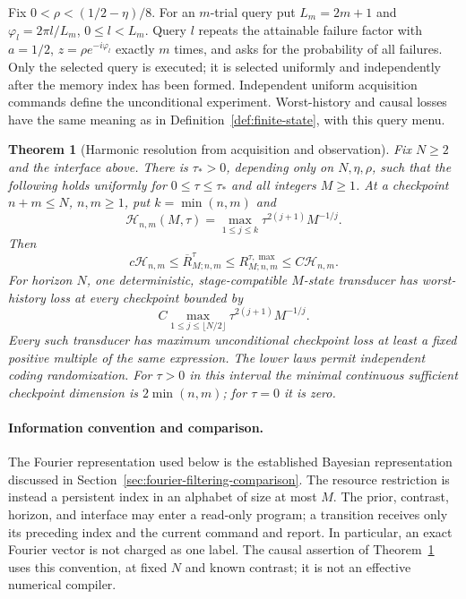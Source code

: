 \documentclass[11pt]{amsart}
\newtheorem{theorem}{Theorem}[section]
\theoremstyle{definition}\newtheorem{definition}[theorem]{Definition}
\theoremstyle{remark}\newtheorem{remark}[theorem]{Remark}
\begin{document}
Fix $0<\rho<(1/2-\eta)/8$. For an $m$-trial query put
$L_m=2m+1$ and $\varphi_l=2\pi l/L_m$, $0\le l<L_m$.
Query $l$ repeats the attainable failure factor with
$a=1/2$, $z=\rho e^{-i\varphi_l}$ exactly $m$ times, and asks for
the probability of all failures. Only the selected query is executed;
it is selected uniformly and independently after the memory index has
been formed. Independent uniform acquisition commands define the
unconditional experiment. Worst-history and causal losses have the same
meaning as in Definition~\ref{def:finite-state}, with this query menu.

\begin{theorem}[Harmonic resolution from acquisition and observation]
\label{thm:circle-resolution}
Fix $N\ge2$ and the interface above. There is $\tau_*>0$, depending
only on $N,\eta,\rho$, such that the following holds uniformly for
$0\le\tau\le\tau_*$ and all integers $M\ge1$. At a checkpoint
$n+m\le N$, $n,m\ge1$, put $k=\min(n,m)$ and
\begin{equation}\label{eq:circle-profile}
 \mathcal H_{n,m}(M,\tau)
 =\max_{1\le j\le k}\tau^{2(j+1)}M^{-1/j}.
\end{equation}
Then
\begin{equation}\label{eq:circle-checkpoint-law}
 c\mathcal H_{n,m}\le\overline R^{\tau}_{M;n,m}
 \le R^{\tau,\max}_{M;n,m}\le C\mathcal H_{n,m}.
\end{equation}
For horizon $N$, one deterministic, stage-compatible $M$-state transducer
has worst-history loss at every checkpoint bounded by
\begin{equation}\label{eq:circle-causal-profile}
 C\max_{1\le j\le\lfloor N/2\rfloor}
          \tau^{2(j+1)}M^{-1/j}.
\end{equation}
Every such transducer has maximum unconditional checkpoint loss at least
a fixed positive multiple of the same expression. The lower laws permit
independent coding randomization. For $\tau>0$ in this interval the
minimal continuous sufficient checkpoint dimension is $2\min(n,m)$;
for $\tau=0$ it is zero.
\end{theorem}

\paragraph{Information convention and comparison.}
The Fourier representation used below is the established Bayesian
representation discussed in Section~\ref{sec:fourier-filtering-comparison}.
The resource restriction is instead a persistent index in an alphabet
of size at most $M$. The prior, contrast, horizon, and interface may
enter a read-only program; a transition receives only its preceding
index and the current command and report. In particular, an exact
Fourier vector is not charged as one label. The causal assertion of
Theorem~\ref{thm:circle-resolution} uses this convention, at fixed
$N$ and known contrast; it is not an effective numerical compiler.
\end{document}
